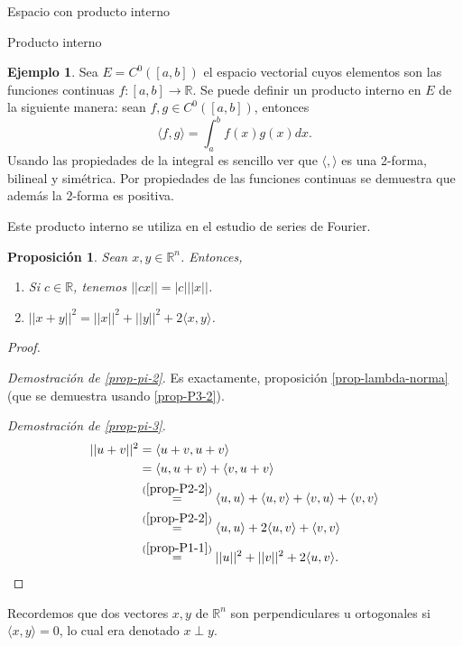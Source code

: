 \documentclass[a4paper,12pt,twoside,spanish]{amsbook}
\newtheorem{proposicion}[teorema]{Proposici\'on}
\theoremstyle{definition}
\newtheorem{ejemplo}{Ejemplo}[section]
\theoremstyle{remark}
\newcommand{\la}{\langle}
\newcommand{\ra}{\rangle}
\newcommand{\R}{\mathbb R}
\begin{document}
\begin{chapter}{Espacio con producto interno}
\begin{section}{Producto interno}
\begin{ejemplo}
			Sea $E = C^0([a,b])$ el espacio vectorial cuyos elementos son las funciones continuas $f: [a, b] \to\R$. Se puede definir un producto interno en $E$ de la siguiente manera: sean $f,g \in  C^0([a,b])$,  entonces
			\begin{equation*}
			\la f, g \ra = \int_a^b f(x)g(x) dx.
			\end{equation*}
			Usando las propiedades de la integral es sencillo ver que $\la , \ra $ es una 2-forma, bilineal y simétrica. Por propiedades de las funciones continuas se demuestra que además la 2-forma es positiva. 
			
			Este producto interno se utiliza en el estudio de series de Fourier.
		\end{ejemplo}
			
			
		
		
		\begin{proposicion} Sean   $x,y \in \R^n$. Entonces, 
			\begin{enumerate}
				\item\label{prop-pi-2} Si $c \in \R$, tenemos $||cx|| = |c|||x||$.
				\item\label{prop-pi-3} $||x+y||^2 = ||x||^2 + ||y||^2 + 2\la x,y\ra$. 
			\end{enumerate}
		\end{proposicion}
		\begin{proof}
			
			${}^{}$
			
			\textit{Demostración de \ref{prop-pi-2}.}  Es exactamente, proposición \ref{prop-lambda-norma} (que se demuestra usando \ref{prop-P3-2}).
			
			\textit{Demostración de \ref{prop-pi-3}.}
			\begin{align*}
				||u+v||^2 &= \la u+v,u+v\ra\\
				&= \la u,u+v\ra+ \la v,u+v\ra  \\
				&\overset{(\ref{prop-P2-2})}{=} \la u,u\ra+ \la u,v\ra+\la v,u\ra+ \la v,v\ra  \\
				&\overset{(\ref{prop-P2-2})}{=} \la u,u\ra+ 2\la u,v\ra+ \la v,v\ra  \\
				&\overset{(\ref{prop-P1-1})}{=} ||u||^2 + ||v||^2 + 2\la u,v\ra.
			\end{align*}
			
			
		\end{proof}
		
		\medskip
		
		Recordemos que dos vectores $x,y$  de $\R^n$ son perpendiculares u ortogonales si $\la x,y\ra =0$, lo cual era denotado $x \perp y$. 
		

\end{section}
\end{chapter}
\end{document}
